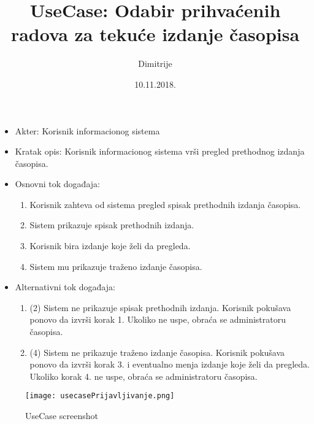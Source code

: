 \documentclass[a4paper]{article}
\title{UseCase: Odabir prihvaćenih radova za tekuće izdanje časopisa}
\date{10.11.2018.}
\author{Dimitrije}
\begin{document}
\maketitle

\begin{itemize}
    \item Akter: Korisnik informacionog sistema
    \item Kratak opis: Korisnik informacionog sistema vrši pregled prethodnog izdanja časopisa.
    \item Osnovni tok događaja:
        \begin{enumerate}
            \item Korisnik zahteva od sistema pregled spisak prethodnih izdanja časopisa.
            \item Sistem prikazuje spisak prethodnih izdanja.
            \item Korisnik bira izdanje koje želi da pregleda.
            \item Sistem mu prikazuje traženo izdanje časopisa.
        \end{enumerate}
    \item Alternativni tok događaja:
        \begin{enumerate}
            \item  (2) Sistem ne prikazuje spisak prethodnih izdanja. Korisnik pokušava ponovo da izvrši korak 1. Ukoliko ne uspe, obraća se administratoru časopisa.
            \item (4) Sistem ne prikazuje traženo izdanje časopisa. Korisnik pokušava ponovo da izvrši korak 3. i eventualno menja izdanje koje želi da pregleda. Ukoliko korak 4. ne uspe, obraća se administratoru časopisa.
        \end{enumerate}
\end{itemize}

\begin{figure}
    \centering
    \texttt{[image: usecasePrijavljivanje.png]}
    \caption{UseCase screenshot}
    \label{fig:my_label}
\end{figure}
\end{document}
